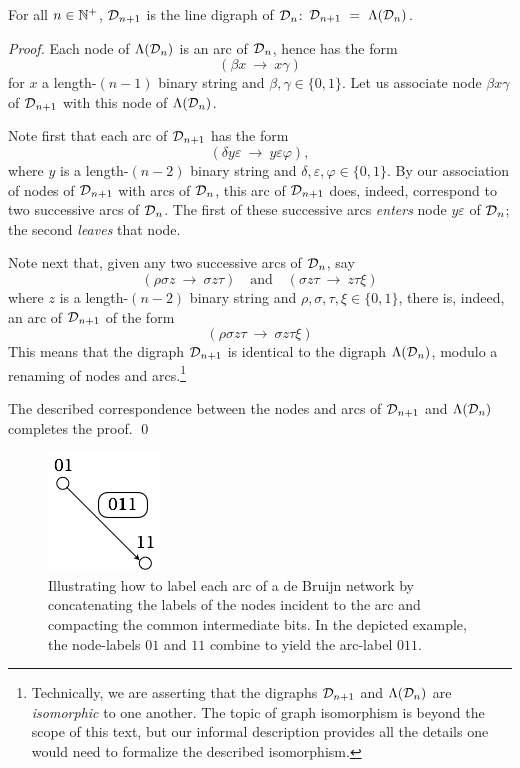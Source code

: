 \begin{prop}
\label{thm:deBruin-linegraph}
For all $n \in \mathbb{N}^+$,
$\mbox{$\cal D$}_{n+1}$ is the line digraph of $\mbox{$\cal D$}_n$: $\d_{n+1} \ = \ \Lambda(\d_n)$.
\end{prop}


\begin{proof}
Each node of $\Lambda(\mbox{$\cal D$}_n)$ is an arc of $\mbox{$\cal D$}_n$, hence has the form
\[ (\beta x \ \rightarrow \ x \gamma) \]
for $x$ a length-$(n-1)$ binary string and $\beta, \gamma \in
\{0,1\}$.  Let us associate node $\beta x \gamma$ of $\mbox{$\cal D$}_{n+1}$ with
this node of $\Lambda(\mbox{$\cal D$}_n)$.

\smallskip

Note first that each arc of $\mbox{$\cal D$}_{n+1}$ has the form
\[ (\delta y \varepsilon \ \rightarrow \ y \varepsilon \varphi), \]
where $y$ is a length-$(n-2)$ binary string and $\delta, \varepsilon,
\varphi \in \{0,1\}$.  By our association of nodes of $\mbox{$\cal D$}_{n+1}$ with
arcs of $\mbox{$\cal D$}_n$, this arc of $\mbox{$\cal D$}_{n+1}$ does, indeed, correspond to two
successive arcs of $\mbox{$\cal D$}_n$.   The first of these successive arcs
{\em enters} node $y \varepsilon$ of $\mbox{$\cal D$}_n$; the second {\em leaves}
that node.


Note next that, given any two successive arcs of $\mbox{$\cal D$}_n$, say
\[
(\rho \sigma z \ \rightarrow \ \sigma z \tau) \ \ \ \mbox { and } \ \ \
(\sigma z \tau \ \rightarrow \  z \tau \xi)
\]
where $z$ is a length-$(n-2)$ binary string and $\rho, \sigma, \tau,
\xi \in \{0,1\}$, there is, indeed, an arc of $\mbox{$\cal D$}_{n+1}$ of the form
\[ (\rho \sigma z \tau \ \rightarrow \ \sigma z \tau \xi) \]
This means that the digraph $\mbox{$\cal D$}_{n+1}$ is identical to the digraph
$\Lambda(\mbox{$\cal D$}_n)$, modulo a renaming of nodes and arcs.\footnote{Technically,
  we are asserting that the digraphs ${\cal D}_{n+1}$ and ${\Lambda}({\cal D}_n)$ 
  are {\it isomorphic} to one another.  The topic of
  graph isomorphism is beyond the scope of this text, but our informal
  description provides all the details one would need to formalize the
  described isomorphism.}

The described correspondence between the nodes and arcs of $\mbox{$\cal D$}_{n+1}$
and $\Lambda(\mbox{$\cal D$}_n)$ completes the proof.  \qed
\end{proof}

\begin{figure}[hbt]
\begin{center}
       \includegraphics[scale=0.6]{FiguresGraph/dBlabelEdge}
\caption{Illustrating how to label each arc of a de Bruijn network by
  concatenating the labels of the nodes incident to the arc and
  compacting the common intermediate bits.  In the depicted example,
  the node-labels $01$ and $11$ combine to yield the arc-label $011$.}
  \label{fig:dBlabelEdge}
\end{center}
\end{figure}

